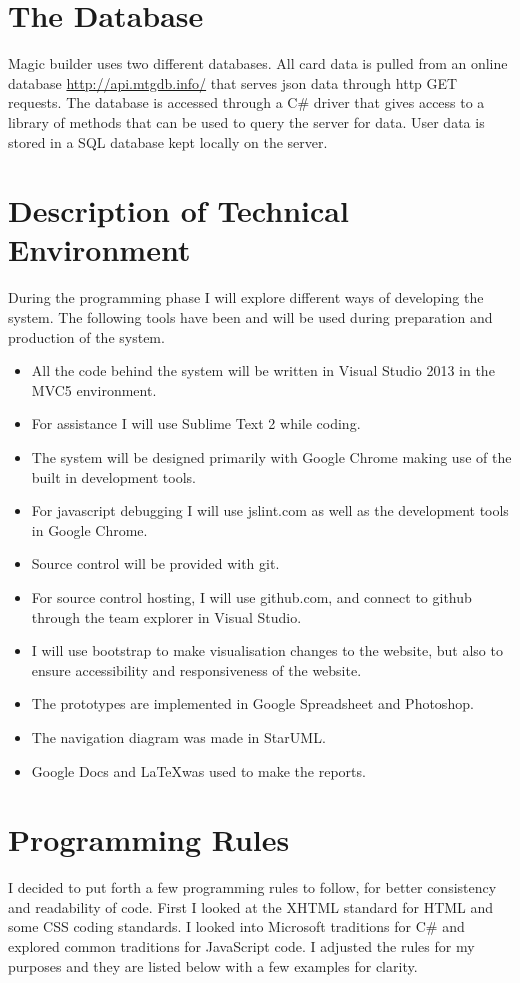\documentclass[paper=a4, fontsize=11pt]{scrartcl} %
\numberwithin{equation}{section} %
\numberwithin{figure}{section} %
\numberwithin{table}{section} %
\begin{document}
\section{The Database}
Magic builder uses two different databases. All card data is pulled from an online database \href{http://api.mtgdb.info/}{http://api.mtgdb.info/} that serves json data through http GET requests. The database is accessed through a C\# driver that gives access to a library of methods that can be used to query the server for data. User data is stored in a SQL database kept locally on the server.

\section{Description of Technical Environment}
During the programming phase I will explore different ways of developing the system. The following tools have been and will be used during preparation and production of the system.
\begin{itemize}
  \item All the code behind the system will be written in Visual Studio 2013 in the MVC5 environment.
  \item For assistance I will use Sublime Text 2 while coding.
  \item The system will be designed primarily with Google Chrome making use of the built in development tools.
  \item For javascript debugging I will use jslint.com as well as the development tools in Google Chrome.
  \item Source control will be provided with git.
  \item For source control hosting, I will use github.com, and connect to github through the team explorer in Visual Studio.
  \item I will use bootstrap to make visualisation changes to the website, but also to ensure accessibility and responsiveness of the website.
  \item The prototypes are implemented in Google Spreadsheet and Photoshop.
  \item The navigation diagram was made in StarUML.
  \item Google Docs and \LaTeX \enspace was used to make the reports.
\end{itemize}

\section{Programming Rules}
I decided to put forth a few programming rules to follow, for better consistency and readability of code. First I looked at the XHTML standard for HTML and some CSS coding standards. I looked into Microsoft traditions for C\# and explored common traditions for JavaScript code. I adjusted the rules for my purposes and they are listed below with a few examples for clarity.
\end{document}
